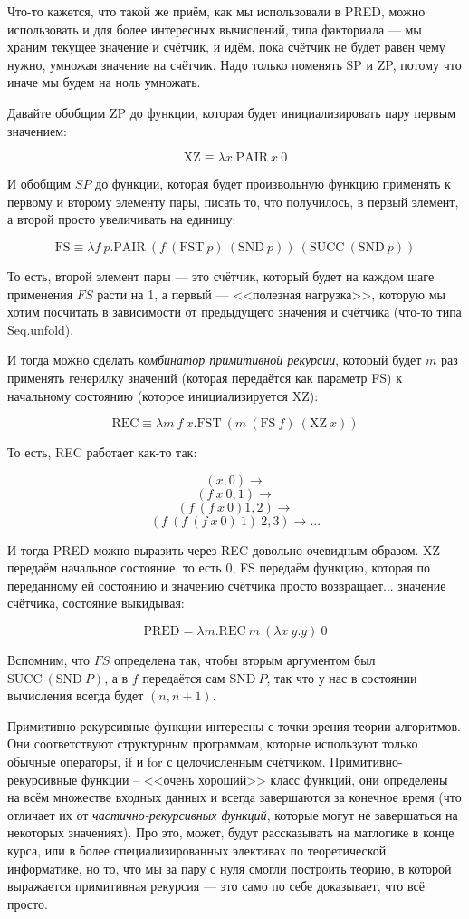 \documentclass[a5paper]{article}
\begin{document}
Что-то кажется, что такой же приём, как мы использовали в PRED, можно использовать и для более интересных вычислений, типа факториала --- мы храним текущее значение и счётчик, и идём, пока счётчик не будет равен чему нужно, умножая значение на счётчик. Надо только поменять SP и ZP, потому что иначе мы будем на ноль умножать.

Давайте обобщим ZP до функции, которая будет инициализировать пару первым значением:

$$\mbox{XZ} \equiv \lambda x.\mbox{PAIR}\ x\ 0$$

И обобщим $SP$ до функции, которая будет произвольную функцию применять к первому и второму элементу пары, писать то, что получилось, в первый элемент, а второй просто увеличивать на единицу:

$$\mbox{FS} \equiv \lambda f\ p.\mbox{PAIR}\ (f\ (\mbox{FST}\ p)\ (\mbox{SND}\ p))\ (\mbox{SUCC}\ (\mbox{SND}\ p))$$

То есть, второй элемент пары --- это счётчик, который будет на каждом шаге применения $FS$ расти на 1, а первый --- <<полезная нагрузка>>, которую мы хотим посчитать в зависимости от предыдущего значения и счётчика (что-то типа Seq.unfold).

И тогда можно сделать \textit{комбинатор примитивной рекурсии}, который будет $m$ раз применять генерилку значений (которая передаётся как параметр FS) к начальному состоянию (которое инициализируется XZ):

$$\mbox{REC} \equiv \lambda m\ f\ x.\mbox{FST}\ (m\ (\mbox{FS}\ f)\ (\mbox{XZ}\ x))$$

То есть, REC работает как-то так:

$$(x, 0) \rightarrow$$
$$(f\ x\ 0, 1) \rightarrow$$
$$(f\ (f\ x\ 0) 1, 2) \rightarrow$$
$$(f\ (f\ (f\ x\ 0)\ 1)\ 2, 3) \rightarrow ...$$

И тогда PRED можно выразить через REC довольно очевидным образом. XZ передаём начальное состояние, то есть 0, FS передаём функцию, которая по переданному ей состоянию и значению счётчика просто возвращает... значение счётчика, состояние выкидывая:

$$\mbox{PRED} = \lambda m.\mbox{REC}\ m\ (\lambda x\ y.y)\ 0$$

Вспомним, что $FS$ определена так, чтобы вторым аргументом был $\mbox{SUCC}\ (\mbox{SND}\ P)$, а в $f$ передаётся сам $\mbox{SND}\ P$, так что у нас в состоянии вычисления всегда будет $(n, n + 1)$.

Примитивно-рекурсивные функции интересны с точки зрения теории алгоритмов. Они соответствуют структурным программам, которые используют только обычные операторы, if и for с целочисленным счётчиком. Примитивно-рекурсивные функции -- <<очень хороший>> класс функций, они определены на всём множестве входных данных и всегда завершаются за конечное время (что отличает их от \textit{частично-рекурсивных функций}, которые могут не завершаться на некоторых значениях). Про это, может, будут рассказывать на матлогике в конце курса, или в более специализированных элективах по теоретической информатике, но то, что мы за пару с нуля смогли построить теорию, в которой выражается примитивная рекурсия --- это само по себе доказывает, что всё просто.
\end{document}
